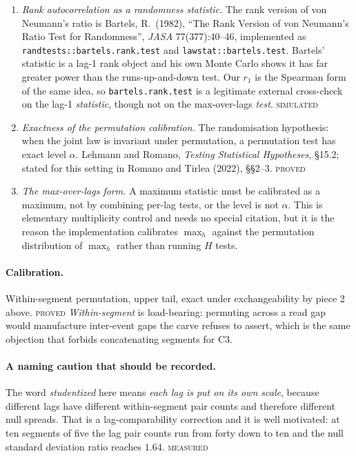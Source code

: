 \documentclass[11pt,a4paper]{article}
\newcommand{\PROVED}{\textsc{\textcolor{blue!55!black}{proved}}}
\newcommand{\SIMULATED}{\textsc{\textcolor{orange!70!black}{simulated}}}
\newcommand{\MEASURED}{\textsc{\textcolor{green!45!black}{measured}}}
\begin{document}
\begin{enumerate}[leftmargin=1.6em,itemsep=2pt]
\item \emph{Rank autocorrelation as a randomness statistic.} The rank version of von
Neumann's ratio is Bartels, R.\ (1982), \enquote{The Rank Version of von Neumann's Ratio
Test for Randomness}, \emph{JASA} 77(377):40--46, implemented as
\texttt{randtests::bartels.rank.test} and \texttt{lawstat::bartels.test}. Bartels'
statistic is a lag-1 rank object and his own Monte Carlo shows it has far greater power
than the runs-up-and-down test. Our $r_1$ is the Spearman form of the same idea, so
\texttt{bartels.rank.test} is a legitimate external cross-check on the lag-1
\emph{statistic}, though not on the max-over-lags \emph{test}. \SIMULATED
\item \emph{Exactness of the permutation calibration.} The randomisation hypothesis:
when the joint law is invariant under permutation, a permutation test has exact level
$\alpha$. Lehmann and Romano, \emph{Testing Statistical Hypotheses}, \S 15.2; stated for
this setting in Romano and Tirlea (2022), \S\S 2--3. \PROVED
\item \emph{The max-over-lags form.} A maximum statistic must be calibrated as a maximum,
not by combining per-lag tests, or the level is not $\alpha$. This is elementary
multiplicity control and needs no special citation, but it is the reason the
implementation calibrates $\max_h$ against the permutation distribution of $\max_h$
rather than running $H$ tests.
\end{enumerate}

\paragraph{Calibration.} Within-segment permutation, upper tail, exact under
exchangeability by piece 2 above. \PROVED{} \emph{Within-segment} is load-bearing:
permuting across a read gap would manufacture inter-event gaps the carve refuses to
assert, which is the same objection that forbids concatenating segments for C3.

\paragraph{A naming caution that should be recorded.}
The word \emph{studentized} here means \emph{each lag is put on its own scale}, because
different lags have different within-segment pair counts and therefore different null
spreads. That is a lag-comparability correction and it is well motivated: at ten
segments of five the lag pair counts run from forty down to ten and the null standard
deviation ratio reaches $1.64$. \MEASURED
\end{document}
